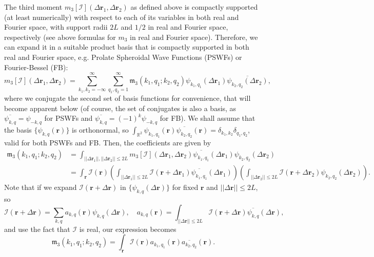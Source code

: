 \documentclass{amsart}
\theoremstyle{definition}
\theoremstyle{remark}
\numberwithin{equation}{section}
\newcommand{\rr}{\mathbf{r}}
\newcommand{\RR}{\mathbb{R}}
\newcommand{\II}{\mathcal{I}}
\begin{document}
The third moment $m_3[\II](\Delta \rr_1,\Delta \rr_2)$ as defined above is compactly supported (at least numerically) with respect to each of its variables in both real and Fourier space, with support radii $2L$ and $1/2$ in real and Fourier space, respectively (see above formulas for $m_3$ in real and Fourier space). Therefore, we can expand it in a suitable product basis that is compactly supported in both real and Fourier space, e.g. Prolate Spheroidal Wave Functions (PSWFs) or Fourier-Bessel (FB):
\[ m_3[\II](\Delta \rr_1, \Delta \rr_2) = \sum_{k_1,k_2=-\infty}^{\infty}\sum_{q_1,q_2=1}^{\infty}\mathfrak{m}_3(k_1,q_1;k_2,q_2)\psi_{k_1,q_1}(\Delta\rr_1)\overline{\psi_{k_2,q_2}(\Delta\rr_2)},\]
where we conjugate the second set of basis functions for convenience, that will become apparent below (of course, the set of conjugates is also a basis, as $\overline{\psi_{k,q}}=\psi_{-k,q}$ for PSWFs and $\overline{\psi_{k,q}}=(-1)^k\psi_{-k,q}$ for FB). We shall assume that the basis $\{\psi_{k,q}(\rr)\}$ is orthonormal, so $\int_{\RR^2}\psi_{k_1,q_1}(\rr)\overline{\psi_{k_2,q_2}}(\rr) = \delta_{k_1,k_2}\delta_{q_1,q_2}$, valid for both PSWFs and FB. Then, the coefficients are given by
\[\begin{aligned} \mathfrak{m}_3(k_1,q_1;k_2,q_2) &= \int_{||\Delta\rr_1||,||\Delta\rr_2||\leq 2L}m_3[\II](\Delta\rr_1,\Delta\rr_2)\overline{\psi_{k_1,q_1}}(\Delta\rr_1)\psi_{k_2,q_2}(\Delta\rr_2)\\
&= \int_{\rr}\II(\rr)\left(\int_{||\Delta\rr_1||\leq 2L}\II(\rr+\Delta\rr_1)\overline{\psi_{k_1,q_1}}(\Delta\rr_1)\right)\left(\int_{||\Delta\rr_2||\leq 2L}\II(\rr+\Delta\rr_2)\psi_{k_2,q_2}(\Delta\rr_2)\right).\end{aligned}\]
Note that if we expand $\II(\rr+\Delta\rr)$ in $\{\psi_{k,q}(\Delta\rr)\}$ for fixed $\rr$ and $||\Delta\rr||\leq 2L$, so
\[ \II(\rr+\Delta\rr) = \sum_{k,q}a_{k,q}(\rr)\psi_{k,q}(\Delta\rr),\quad a_{k,q}(\rr)=\int_{||\Delta\rr||\leq 2L}\II(\rr+\Delta\rr)\overline{\psi_{k,q}}(\Delta\rr),\]
and use the fact that $\II$ is real, our expression becomes
\[ \mathfrak{m}_3(k_1,q_1;k_2,q_2) = \int_{\rr}\II(\rr)a_{k_1,q_1}(\rr)\overline{a_{k_2,q_2}}(\rr).\]
\end{document}
